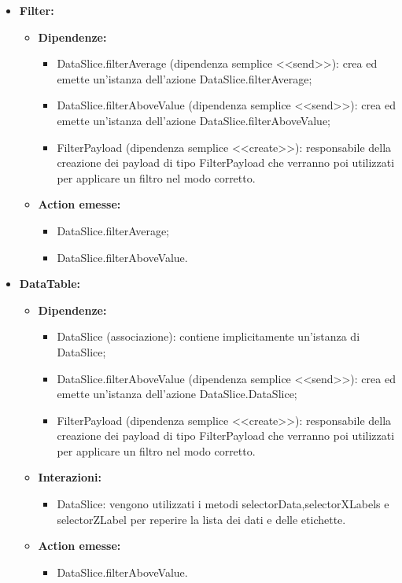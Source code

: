 \begin{itemize}
    \item \textbf{Filter:}
    \begin{itemize}
        \item \textbf{Dipendenze:}
        \begin{itemize}
            \item DataSlice.filterAverage (dipendenza semplice <<send>>): crea ed emette un’istanza dell’azione DataSlice.filterAverage;
            \item DataSlice.filterAboveValue (dipendenza semplice <<send>>): crea ed emette un’istanza dell’azione DataSlice.filterAboveValue;
            \item FilterPayload (dipendenza semplice <<create>>): responsabile della creazione dei payload di tipo FilterPayload che verranno poi utilizzati per applicare un filtro nel modo corretto.
        \end{itemize} 
        \item \textbf{Action emesse:}
        \begin{itemize}
            \item DataSlice.filterAverage;
            \item DataSlice.filterAboveValue.
        \end{itemize} 
    \end{itemize}

    \item \textbf{DataTable:}
    \begin{itemize}
        \item \textbf{Dipendenze:}
        \begin{itemize}
            \item DataSlice (associazione): contiene implicitamente un'istanza di DataSlice;
            \item DataSlice.filterAboveValue (dipendenza semplice <<send>>): crea ed emette un’istanza dell’azione DataSlice.DataSlice;
            \item FilterPayload (dipendenza semplice <<create>>): responsabile della creazione dei payload di tipo FilterPayload che verranno poi utilizzati per applicare un filtro nel modo corretto.
        \end{itemize} 
        \item \textbf{Interazioni:}
        \begin{itemize}
            \item DataSlice: vengono utilizzati i metodi selectorData,selectorXLabels e selectorZLabel per reperire la lista dei dati e delle etichette.
        \end{itemize} 
        \item \textbf{Action emesse:}
        \begin{itemize}
            \item DataSlice.filterAboveValue.
        \end{itemize} 
    \end{itemize}


\end{itemize}
